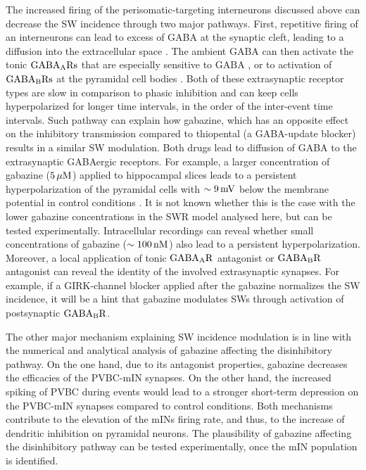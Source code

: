       The increased firing of the perisomatic-targeting interneurons discussed
      above can decrease the SW incidence through two major pathways. First,
      repetitive firing of an interneurons can lead to excess of GABA at the
      synaptic cleft, leading to a diffusion into the extracellular space
      \citep{Farrant2005}. The ambient GABA can then activate the tonic $\rm
      GABA_ARs$ that are especially sensitive to GABA \citep{Semyanov2004}, or
      to activation of $\rm GABA_BRs$ at the pyramidal cell bodies
      \citep{Scanziani2000}. Both of these extrasynaptic receptor types are
      slow in comparison to phasic inhibition and can keep cells hyperpolarized
      for longer time intervals, in the order of the inter-event time
      intervals. Such pathway can explain how gabazine, which has an opposite
      effect on the inhibitory transmission compared to thiopental (a
      GABA-update blocker) results in a similar SW modulation. Both drugs lead
      to diffusion of GABA to the extrasynaptic GABAergic receptors. For
      example, a larger concentration of gabazine ($5\,\rm \mu M$) applied to
      hippocampal slices leads to a persistent hyperpolarization of the
      pyramidal cells with $\sim 9\, \rm mV$ below the membrane potential in
      control conditions \citep{Behrens2007}. It is not known whether this is
      the case with the lower gabazine concentrations in the SWR model analysed
      here, but can be tested experimentally. Intracellular recordings can
      reveal whether small concentrations of gabazine ($\sim 100 \, \rm nM$)
      also lead to a persistent hyperpolarization. Moreover, a local
      application of tonic $\rm GABA_AR$ antagonist \citep[e.g.,
      DPP-4-PIO;][]{Boddum2014} or $\rm GABA_BR$ antagonist can reveal the
      identity of the involved extrasynaptic synapses. For example, if a
      GIRK-channel blocker applied after the gabazine normalizes the SW
      incidence, it will be a hint that gabazine modulates SWs through
      activation of postsynaptic $\rm GABA_BR$.

      The other major mechanism explaining SW incidence modulation is in line
      with the numerical and analytical analysis of gabazine affecting the
      disinhibitory pathway. On the one hand, due to its antagonist properties,
      gabazine decreases the efficacies of the PVBC-mIN synapses. On the other
      hand, the increased spiking of PVBC during events would lead to a
      stronger short-term depression on the PVBC-mIN synapses compared to
      control conditions. Both mechanisms contribute to the elevation of the
      mINs firing rate, and thus, to the increase of dendritic inhibition on
      pyramidal neurons. The plausibility of gabazine affecting the
      disinhibitory pathway can be tested experimentally, once the mIN
      population is identified.

